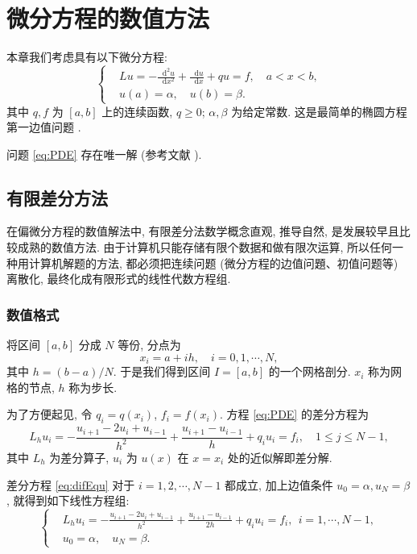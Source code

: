 \documentclass[zihao=-4]{ctexart}
\numberwithin{equation}{section}
\numberwithin{figure}{section}
\numberwithin{table}{section}
\theoremstyle{plain}
\newcommand{\dif}{\mathop{}\!\mathrm{d}}
\begin{document}


\section{微分方程的数值方法}

本章我们考虑具有以下微分方程:
\begin{equation}\label{eq:PDE}
\left\{\begin{aligned}
& L u=-\frac{{\dif}^{2} u}{\dif x^{2}}+\frac{\dif u}{\dif x}+q u=f, \quad a < x < b, \\
& u(a)=\alpha, \quad u(b)=\beta.
\end{aligned}\right.
\end{equation}
其中 $q, f$ 为 $[a,b]$ 上的连续函数, $q \geqslant 0$; $\alpha, \beta$ 为给定常数. 这是最简单的椭圆方程第一边值问题 .

问题 \eqref{eq:PDE} 存在唯一解 (参考文献 \cite{LiLiu1997}).


\subsection{有限差分方法}
在偏微分方程的数值解法中, 有限差分法数学概念直观, 推导自然, 是发展较早且比较成熟的数值方法. 由于计算机只能存储有限个数据和做有限次运算, 所以任何一种用计算机解题的方法, 都必须把连续问题 (微分方程的边值问題、初值问题等) 离散化, 最终化成有限形式的线性代数方程组.

\subsubsection{数值格式}
将区间 $[a,b]$ 分成 $N$ 等份, 分点为
\begin{equation*}
  x_{i} = a+ih, \quad i=0,1, \cdots, N,
\end{equation*}
其中 $h=(b-a)/N$. 于是我们得到区间 $I=[a,b]$ 的一个网格剖分. $x_i$ 称为网格的节点, $h$ 称为步长.

为了方便起见, 令 $q_{i}=q(x_{i})$, $f_{i}=f(x_{i})$. 方程 \eqref{eq:PDE} 的差分方程为
\begin{equation}\label{eq:difEqu}
  L_{h} u_{i}=-\frac{u_{i+1}-2 u_{i}+u_{i-1}}{h^{2}}+\frac{u_{i+1}-u_{i-1}}{h}+q_{i} u_{i}=f_{i},\quad 1 \leqslant j \leqslant N-1,
\end{equation}
其中 $L_{h}$ 为差分算子, $u_i$ 为 $u(x)$ 在 $x=x_i$ 处的近似解即差分解.

差分方程 \eqref{eq:difEqu} 对于 $i=1,2, \cdots, N-1$ 都成立, 加上边值条件 $u_{0}=\alpha, u_{N}=\beta$, 就得到如下线性方程组:
\begin{equation}\label{eq:fdm}
\left\{\begin{aligned}
& L_{h} u_{i}=-\frac{u_{i+1}-2 u_{i}+u_{i-1}}{h^{2}}+\frac{u_{i+1}-u_{i-1}}{2h}+q_{i} u_{i}=f_{i}, ~~ i=1, \cdots, N-1, \\
& u_{0}=\alpha, \quad u_{N}=\beta.
\end{aligned}\right.
\end{equation}
\end{document}
